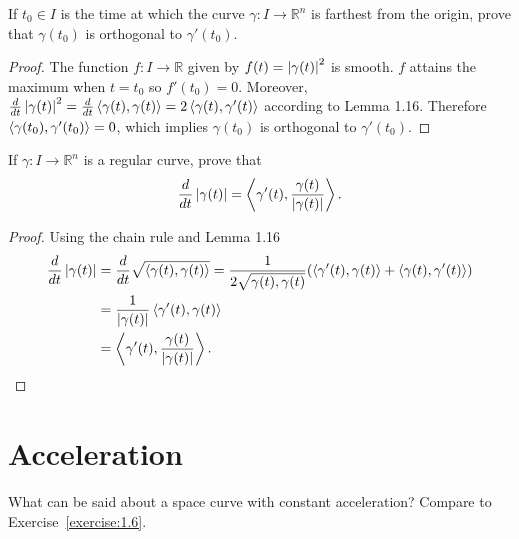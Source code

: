 \begin{exercise}{1.24}
	If $t_{0}\in I$ is the time at which the curve $\gamma: I \to \mathbb{R}^{n}$ is farthest from the origin, prove that $\gamma(t_{0})$ is orthogonal to $\gamma'(t_{0})$.
\end{exercise}

\begin{proof}
	The function $f: I \to \mathbb{R}$ given by $f(t) = \left\vert{\gamma(t)}\right\vert^{2}$ is smooth. $f$ attains the maximum when $t = t_{0}$ so $f'(t_{0}) = 0$. Moreover, $\frac{d}{dt}\left\vert{\gamma(t)}\right\vert^{2} = \frac{d}{dt}\left\langle{\gamma(t), \gamma(t)}\right\rangle = 2\left\langle{\gamma(t), \gamma'(t)}\right\rangle$ according to Lemma 1.16. Therefore $\left\langle{\gamma(t_{0}), \gamma'(t_{0})}\right\rangle = 0$, which implies $\gamma(t_{0})$ is orthogonal to $\gamma'(t_{0})$.
\end{proof}

\begin{exercise}{1.25}\label{exercise:1.25}
	If $\gamma: I \to \mathbb{R}^{n}$ is a regular curve, prove that
	\begin{equation*}
		\frac{d}{dt}\left\vert{\gamma(t)}\right\vert = \left\langle{\gamma'(t), \frac{\gamma(t)}{\left\vert{\gamma(t)}\right\vert}}\right\rangle.
	\end{equation*}
\end{exercise}

\begin{proof}
	Using the chain rule and Lemma 1.16
	\begin{align*}
		\frac{d}{dt}\left\vert{\gamma(t)}\right\vert & = \frac{d}{dt}\sqrt{\left\langle{\gamma(t), \gamma(t)}\right\rangle} = \frac{1}{2\sqrt{\gamma(t), \gamma(t)}}(\left\langle{\gamma'(t),\gamma(t)}\right\rangle + \left\langle{\gamma(t),\gamma'(t)}\right\rangle) \\
		                            & = \frac{1}{\left\vert{\gamma(t)}\right\vert}\left\langle{\gamma'(t), \gamma(t)}\right\rangle                                                                                                        \\
		                            & = \left\langle{\gamma'(t), \frac{\gamma(t)}{\left\vert{\gamma(t)}\right\vert}}\right\rangle.\qedhere
	\end{align*}
\end{proof}

\section{Acceleration}

\begin{exercise}{1.26}
	What can be said about a space curve with constant acceleration? Compare to Exercise~\ref{exercise:1.6}.
\end{exercise}

